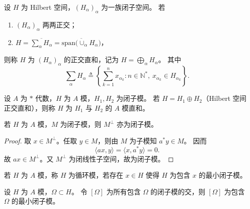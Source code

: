 \documentclass[lang=cn,a4paper,newtx,section]{elegantbook}
\begin{document}
  \begin{definition}
    设 $H$ 为 Hilbert 空间，$(H_\alpha)_{\alpha}$ 为一族闭子空间。
    若
    \begin{enumerate}
      \item $(H_\alpha)_{\alpha}$ 两两正交；
      \item $H=\overline{\sum_{\alpha} H_\alpha}=\overline{\mathrm{span}\bigl(\cup_{\alpha}H_\alpha\bigr)}$，
    \end{enumerate}
    则称 $H$ 为 $(H_\alpha)_{\alpha}$ 的正交直和，记为 $H=\bigoplus_{\alpha} H_\alpha$。
    其中
    \[
      \sum_{\alpha} H_\alpha\triangleq \left\{\sum_{k=1}^n x_{\alpha_k}: n\in\mathbb{N}^*,\ x_{\alpha_k}\in H_{\alpha_k}\right\}.
    \]
  \end{definition}

  \begin{definition}
    设 $A$ 为 $*$ 代数，$H$ 为 $A$ 模，$H_1,H_2$ 为闭子模。
    若 $H=H_1\oplus H_2$（Hilbert 空间正交直和），则称 $H$ 为 $H_1$ 与 $H_2$ 的 $A$ 模直和。
  \end{definition}

  \begin{proposition}\label{prop:perp-submod}
    若 $H$ 为 $A$ 模，$M$ 为闭子模，则 $M^{\perp}$ 亦为闭子模。
  \end{proposition}

  \begin{proof}
    取 $x\in M^{\perp}$。任取 $y\in M$，则由 $M$ 为子模知 $a^*y\in M$。
    因而
    \begin{equation*}
      \langle ax,y\rangle=\langle x,a^*y\rangle=0.
    \end{equation*}
    故 $ax\in M^{\perp}$。又 $M^{\perp}$ 为闭线性子空间，故为闭子模。
  \end{proof}

  \begin{definition}
    若 $H$ 为 $A$ 模，称 $H$ 为循环模，若存在 $x\in H$ 使得 $H$ 为包含 $x$ 的最小闭子模。
  \end{definition}

  \begin{remark}
    设 $H$ 为 $A$ 模，$\Omega\subset H$。
    令 $[\Omega]$ 为所有包含 $\Omega$ 的闭子模的交，则 $[\Omega]$ 为包含 $\Omega$ 的最小闭子模。
  \end{remark}
\end{document}
